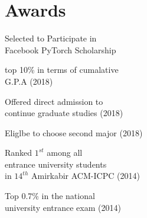 \documentclass[]{deedy-resume-openfont}
\begin{document}
\begin{minipage}[t]{0.33\textwidth}
\section{Awards}
    \vspace{\topsep} %
\begin{tightemize}
\item Selected to Participate in \\
	Facebook PyTorch Scholarship
\item top 10\% in terms of cumalative \\ G.P.A (2018)
\item Offered direct admission to \\ continue graduate studies (2018)
\item Eliglbe to choose second major (2018)
\item Ranked $1^{st}$ among all \\ entrance university students \\
	in ${14^{th}}$ Amirkabir ACM-ICPC (2014)
\item Top 0.7\% in the national \\university entrance exam (2014)
\end{tightemize}

%
%

\end{minipage}
\hfill
\end{document}
